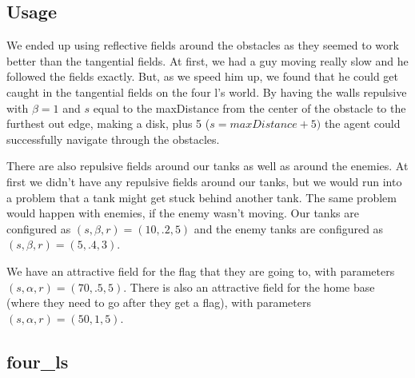 \documentclass[11pt]{article}
\begin{document}
\subsection{Usage}

We ended up using reflective fields around the obstacles as they seemed to work better than the tangential fields.
At first, we had a guy moving really slow and he followed the fields exactly.
But, as we speed him up, we found that he could get caught in the tangential fields on the four l's world.
By having the walls repulsive with $\beta = 1$ and $s$ equal to the maxDistance from the center of the obstacle to the furthest out edge, making a disk, plus 5 ($s=maxDistance + 5)$ the agent could successfully navigate through the obstacles.

There are also repulsive fields around our tanks as well as around the enemies.
At first we didn't have any repulsive fields around our tanks, but we would run into a problem that a tank might get stuck behind another tank.
The same problem would happen with enemies, if the enemy wasn't moving.
Our tanks are configured as $(s, \beta, r) = (10, .2, 5)$ and the enemy tanks are configured as $(s, \beta, r) = (5, .4, 3)$.

We have an attractive field for the flag that they are going to, with parameters $(s, \alpha, r) = (70, .5, 5)$. 
There is also an attractive field for the home base (where they need to go after they get a flag), with parameters $(s, \alpha, r) = (50, 1, 5)$. 

\subsection{four\_ls}
\end{document}
